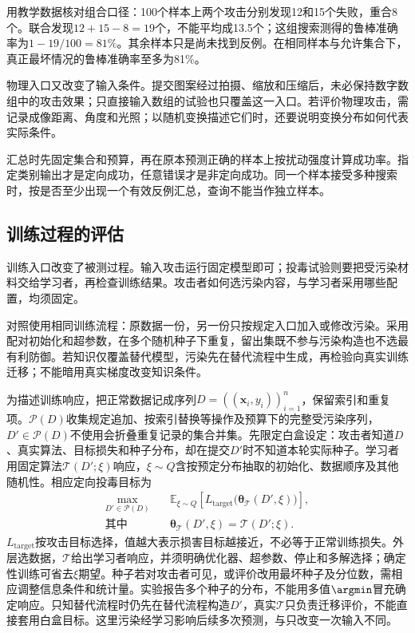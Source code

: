 用教学数据核对组合口径：100个样本上两个攻击分别发现12和15个失败，重合8个。联合发现$12+15-8=19$个，不能平均成13.5个；这组搜索测得的鲁棒准确率为$1-19/100=81\%$。其余样本只是尚未找到反例。在相同样本与允许集合下，真正最坏情况的鲁棒准确率至多为81\%。

物理入口又改变了输入条件。提交图案经过拍摄、缩放和压缩后，未必保持数字数组中的攻击效果；只直接输入数组的试验也只覆盖这一入口。若评价物理攻击，需记录成像距离、角度和光照；以随机变换描述它们时，还要说明变换分布如何代表实际条件。

汇总时先固定集合和预算，再在原本预测正确的样本上按扰动强度计算成功率。指定类别输出才是定向成功，任意错误才是非定向成功。同一个样本接受多种搜索时，按是否至少出现一个有效反例汇总，查询不能当作独立样本。

\subsection{训练过程的评估}
\label{sec:security-training-test}

训练入口改变了被测过程。输入攻击运行固定模型即可；投毒试验则要把受污染材料交给学习者，再检查训练结果。攻击者如何选污染内容，与学习者采用哪些配置，均须固定。

对照使用相同训练流程：原数据一份，另一份只按规定入口加入或修改污染。采用配对初始化和超参数，在多个随机种子下重复，留出集既不参与污染构造也不选最有利防御。若知识仅覆盖替代模型，污染先在替代流程中生成，再检验向真实训练迁移；不能暗用真实梯度改变知识条件。

为描述训练响应，把正常数据记成序列$D=((\bm{x}_i,y_i))_{i=1}^{n}$，保留索引和重复项。$\mathcal P(D)$收集规定追加、按索引替换等操作及预算下的完整受污染序列，$D'\in\mathcal P(D)$不使用会折叠重复记录的集合并集。先限定白盒设定：攻击者知道$D$、真实算法、目标损失和种子分布，却在提交$D'$时不知道本轮实际种子。学习者用固定算法$\mathcal T(D';\xi)$响应，$\xi\sim Q$含按预定分布抽取的初始化、数据顺序及其他随机性。相应定向投毒目标为
\begin{equation}
 \begin{aligned}
 \max_{D'\in\mathcal P(D)}\quad&
 \mathbb E_{\xi\sim Q}
 \left[L_{\mathrm{target}}\bigl(\bm{\theta}_{\mathcal T}
       (D',\xi)\bigr)\right],\\
 \text{其中}\quad&
 \bm{\theta}_{\mathcal T}(D',\xi)
 =\mathcal T(D';\xi).
 \end{aligned}
 \label{eq:security-poison-bilevel}
\end{equation}
$L_{\mathrm{target}}$按攻击目标选择，值越大表示损害目标越接近，不必等于正常训练损失。外层选数据，$\mathcal T$给出学习者响应，并须明确优化器、超参数、停止和多解选择；确定性训练可省去$\xi$期望。种子若对攻击者可见，或评价改用最坏种子及分位数，需相应调整信息条件和统计量。实验报告多个种子的分布，不能用多值$\argmin$冒充确定响应。只知替代流程时仍先在替代流程构造$D'$，真实$\mathcal T$只负责迁移评价，不能直接套用白盒目标。这里污染经学习影响后续多次预测，与只改变一次输入不同。

